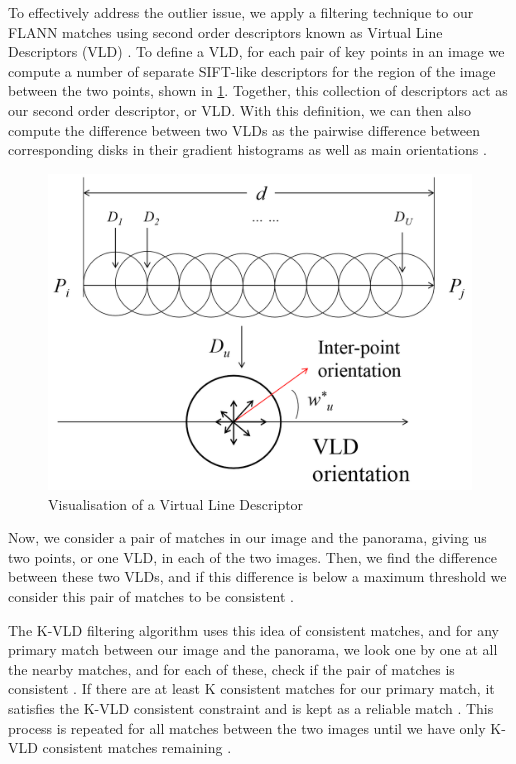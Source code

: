 \documentclass[conference]{IEEEtran}
\begin{document}
To effectively address the outlier issue, we apply a filtering technique to our FLANN matches using second order descriptors known as Virtual Line Descriptors (VLD) \cite{kvld}. To define a VLD, for each pair of key points in an image we compute a number of separate SIFT-like descriptors for the region of the image between the two points, shown in \ref{vld}. Together, this collection of descriptors act as our second order descriptor, or VLD. With this definition, we can then also compute the difference between two VLDs as the pairwise difference between corresponding disks in their gradient histograms as well as main orientations \cite{kvld}.

\begin{figure}[htb]
\centerline{\includegraphics[scale=0.3]{Images/line_descriptor.png}}
\caption{Visualisation of a Virtual Line Descriptor \cite{kvld}}
\label{vld}
\end{figure}

Now, we consider a pair of matches in our image and the panorama, giving us two points, or one VLD, in each of the two images. Then, we find the difference between these two VLDs, and if this difference is below a maximum threshold we consider this pair of matches to be consistent \cite{kvld}.

The K-VLD filtering algorithm uses this idea of consistent matches, and for any primary match between our image and the panorama, we look one by one at all the nearby matches, and for each of these, check if the pair of matches is consistent \cite{kvld}. If there are at least K consistent matches for our primary match, it satisfies the K-VLD consistent constraint and is kept as a reliable match \cite{kvld}. This process is repeated for all matches between the two images until we have only K-VLD consistent matches remaining \cite{kvld}.
\end{document}
